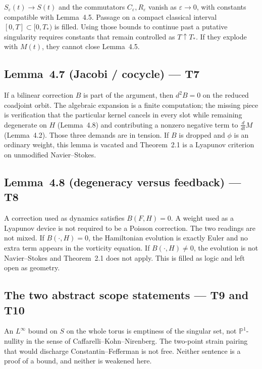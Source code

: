 \documentclass[11pt]{article}
\theoremstyle{plain}
\theoremstyle{definition}
\theoremstyle{remark}
\begin{document}
\(S_{\varepsilon}(t)\to S(t)\) and the commutators \(C_{\varepsilon},R_{\varepsilon}\) vanish as \(\varepsilon\to 0\), with constants compatible with Lemma~4.5. Passage on a compact classical interval \([0,T]\subset[0,T_{\ast})\) is filled. Using those bounds to continue past a putative singularity requires constants that remain controlled as \(T\uparrow T_{\ast}\). If they explode with \(M(t)\), they cannot close Lemma~4.5.

\subsection{Lemma~4.7 (Jacobi / cocycle) --- T7}

If a bilinear correction \(B\) is part of the argument, then \(d^{2}B=0\) on the reduced coadjoint orbit. The algebraic expansion is a finite computation; the missing piece is verification that the particular kernel cancels in every slot while remaining degenerate on \(H\) (Lemma~4.8) and contributing a nonzero negative term to \(\frac{d}{dt}M\) (Lemma~4.2). Those three demands are in tension. If \(B\) is dropped and \(\phi\) is an ordinary weight, this lemma is vacated and Theorem~2.1 is a Lyapunov criterion on unmodified Navier--Stokes.

\subsection{Lemma~4.8 (degeneracy versus feedback) --- T8}

A correction used as dynamics satisfies \(B(F,H)=0\). A weight used as a Lyapunov device is not required to be a Poisson correction. The two readings are not mixed. If \(B(\cdot,H)=0\), the Hamiltonian evolution is exactly Euler and no extra term appears in the vorticity equation. If \(B(\cdot,H)\neq 0\), the evolution is not Navier--Stokes and Theorem~2.1 does not apply. This is filled as logic and left open as geometry.

\subsection{The two abstract scope statements --- T9 and T10}

An \(L^{\infty}\) bound on \(S\) on the whole torus is emptiness of the singular set, not \(\mathbb{P}^{1}\)-nullity in the sense of Caffarelli--Kohn--Nirenberg. The two-point strain pairing that would discharge Constantin--Fefferman is not free. Neither sentence is a proof of a bound, and neither is weakened here.
\end{document}
